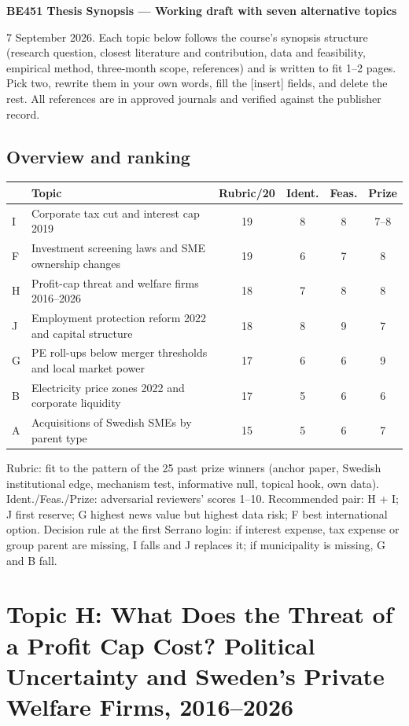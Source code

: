 \documentclass[12pt,a4paper]{article}
\begin{document}
{\large\bfseries BE451 Thesis Synopsis --- Working draft with seven alternative topics}

7 September 2026. Each topic below follows the course's synopsis structure (research question, closest literature and contribution, data and feasibility, empirical method, three-month scope, references) and is written to fit 1--2 pages. Pick two, rewrite them in your own words, fill the [insert] fields, and delete the rest. All references are in approved journals and verified against the publisher record.

\subsection*{Overview and ranking}

\begin{tabular}{@{}p{0.5cm}p{7.2cm}cccc@{}}
\toprule
 & Topic & Rubric/20 & Ident. & Feas. & Prize \\
\midrule
I & Corporate tax cut and interest cap 2019 & 19 & 8 & 8 & 7--8 \\
F & Investment screening laws and SME ownership changes & 19 & 6 & 7 & 8 \\
H & Profit-cap threat and welfare firms 2016--2026 & 18 & 7 & 8 & 8 \\
J & Employment protection reform 2022 and capital structure & 18 & 8 & 9 & 7 \\
G & PE roll-ups below merger thresholds and local market power & 17 & 6 & 6 & 9 \\
B & Electricity price zones 2022 and corporate liquidity & 17 & 5 & 6 & 6 \\
A & Acquisitions of Swedish SMEs by parent type & 15 & 5 & 6 & 7 \\
\bottomrule
\end{tabular}

Rubric: fit to the pattern of the 25 past prize winners (anchor paper, Swedish institutional edge, mechanism test, informative null, topical hook, own data). Ident./Feas./Prize: adversarial reviewers' scores 1--10. Recommended pair: H + I; J first reserve; G highest news value but highest data risk; F best international option. Decision rule at the first Serrano login: if interest expense, tax expense or group parent are missing, I falls and J replaces it; if municipality is missing, G and B fall.

\newpage

\section{Topic H: What Does the Threat of a Profit Cap Cost? Political Uncertainty and Sweden's Private Welfare Firms, 2016--2026}
\end{document}
